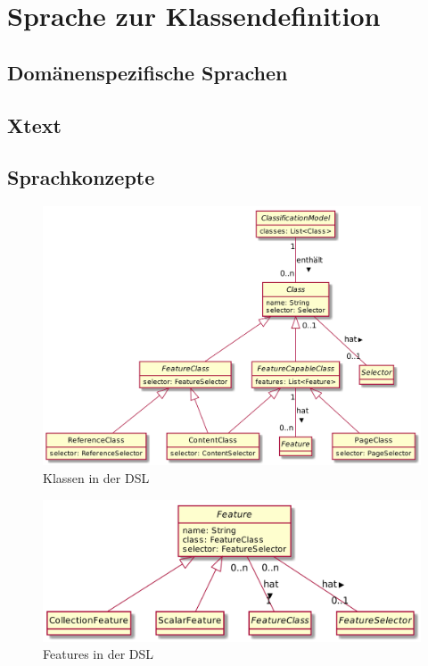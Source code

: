 \section{Sprache zur Klassendefinition}
    \label{section:solutionDetailsDSL}
    \subsection{Domänenspezifische Sprachen}
    \subsection{Xtext}

    \subsection{Sprachkonzepte}
        \begin{figure}[htb]
            \centering
            \includegraphics[width=\textwidth]{../resources/dsl/classes.png}
            \caption{Klassen in der DSL}
            \label{image:dslClasses}
        \end{figure}

        \begin{figure}[htb]
            \centering
            \includegraphics[width=\textwidth]{../resources/dsl/features.png}
            \caption{Features in der DSL}
            \label{image:dslFeatures}
        \end{figure}

